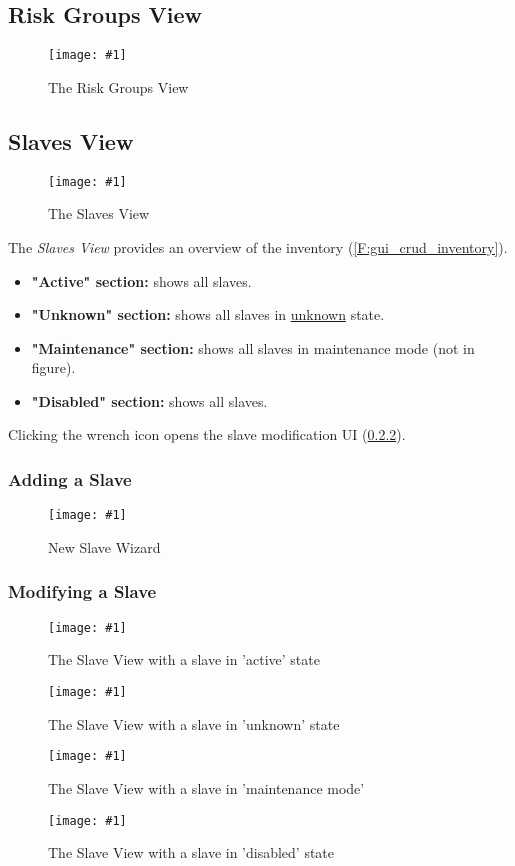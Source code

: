 \documentclass[a4paper, 11pt]{article}
\newcommand{\mamidscreenshot}[1]{\texttt{[image: \#1]}}
\newcommand{\uiel}[3]{\item \textbf{"#1" #2:} #3}
\begin{document}
\subsection{Risk Groups View}
\begin{figure}[H]
	\centering
	\mamidscreenshot{screenshots/risk_groups}
	\caption{The Risk Groups View}
\end{figure}
\subsection{Slaves View}
\begin{figure}[H]
	\centering
	\mamidscreenshot{screenshots/slaves}
	\caption{The Slaves View}
\end{figure}

The \textit{Slaves View} provides an overview of the inventory (\ref{F:gui_crud_inventory}).\\
\begin{itemize}
	\uiel{Active}{section}{shows all  slaves}.
	\uiel{Unknown}{section}{shows all slaves in \hyperref[SM:SlaveModes]{unknown} state}.
	\uiel{Maintenance}{section}{shows all slaves in \gls{maintenance mode} (not in figure)}.
	\uiel{Disabled}{section}{shows all \glslink{disabled mode}{disabled} slaves}.
\end{itemize}
Clicking the wrench icon opens the slave modification UI (\ref{subsec:ui:modify_slave}).

\subsubsection{Adding a Slave}
\begin{figure}[H]
	\centering
	\mamidscreenshot{screenshots/new_slave}
	\caption{New Slave Wizard}
\end{figure}

\subsubsection{Modifying a Slave}\label{subsec:ui:modify_slave}
\begin{figure}[H]
	\centering
	\mamidscreenshot{screenshots/slave_edit_active.png}
	\caption{The Slave View with a slave in 'active' state}
\end{figure}
\begin{figure}[H]
	\centering
	\mamidscreenshot{screenshots/slave_edit_unknown.png}
	\caption{The Slave View with a slave in 'unknown' state}
\end{figure}
\begin{figure}[H]
	\centering
	\mamidscreenshot{screenshots/slave_edit_maintenance}
	\caption{The Slave View with a slave in 'maintenance mode'}
\end{figure}
\begin{figure}[H]
	\centering
	\mamidscreenshot{screenshots/slave_edit_disabled.png}
	\caption{The Slave View with a slave in 'disabled' state}
\end{figure}
\end{document}
